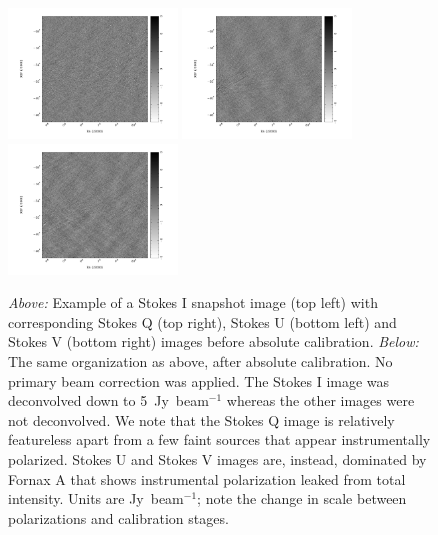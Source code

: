 \begin{figure}[h!]
\includegraphics[width=0.4\textwidth]{chapters/eor_window_PAPER/figures/zen_2455819_50285-Q-image.pdf}
\includegraphics[width=0.4\textwidth]{chapters/eor_window_PAPER/figures/zen_2455819_50285-U-image.pdf}
\includegraphics[width=0.4\textwidth]{chapters/eor_window_PAPER/figures/zen_2455819_50285-V-image.pdf}
\caption[Snapshot images of Stokes parameters before and absolute calibration.]{\textit{Above:} Example of a Stokes I snapshot image (top left) with corresponding Stokes Q (top right), Stokes U (bottom left) and Stokes V (bottom right) images before absolute calibration. \textit{Below:} The same organization as above, after absolute calibration. No primary beam correction was applied. The Stokes I image was deconvolved down to 5~Jy~beam$^{-1}$ whereas the other images were not deconvolved. We note that the Stokes Q image is relatively featureless apart from a few faint sources that appear instrumentally polarized. Stokes U and Stokes V images are, instead, dominated by Fornax A that shows instrumental polarization leaked from total intensity. Units are Jy~beam$^{-1}$; note the change in scale between polarizations and calibration stages.}
\label{fig:psa32_sky_image}
\end{figure}

